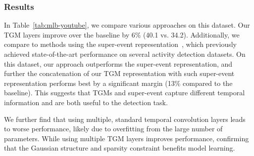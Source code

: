 \documentclass{article}
\begin{document}
\subsubsection{Results}
In Table~\ref{tab:mlb-youtube}, we compare various approaches on this dataset. Our TGM layers improve over the baseline by 6\% (40.1 vs. 34.2). Additionally, we compare to methods using the super-event representation~\citep{piergiovanni2018super}, which previously achieved state-of-the-art performance on several activity detection datasets. On this dataset, our approach outperforms the super-event representation, and further the concatenation of our TGM representation with such super-event representation performs best by a significant margin (13\% compared to the baseline). This suggests that TGMs and super-event capture different temporal information and are both useful to the detection task.

We further find that using multiple, standard temporal convolution layers leads to worse performance, likely due to overfitting from the large number of parameters. While using multiple TGM layers improves performance, confirming that the Gaussian structure and sparsity constraint benefits model learning.
\end{document}
